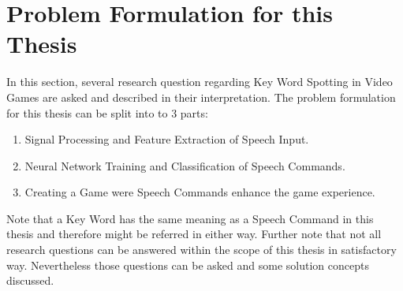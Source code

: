 \section{Problem Formulation for this Thesis}
In this section, several research question regarding Key Word Spotting in Video Games are asked and described in their interpretation.
The problem formulation for this thesis can be split into to 3 parts:

\begin{enumerate}[label={Q.\arabic*)}, leftmargin=1.4cm]
    \item Signal Processing and Feature Extraction of Speech Input.
    \item Neural Network Training and Classification of Speech Commands.
    \item Creating a Game were Speech Commands enhance the game experience.
\end{enumerate}
Note that a Key Word has the same meaning as a Speech Command in this thesis and therefore might be referred in either way.
Further note that not all research questions can be answered within the scope of this thesis in satisfactory way.
Nevertheless those questions can be asked and some solution concepts discussed. 



